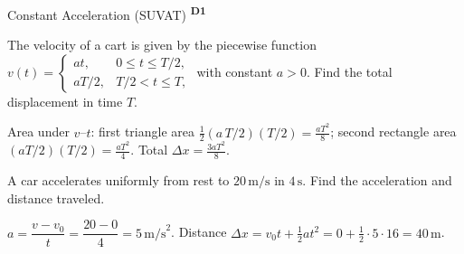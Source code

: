 ﻿\documentclass[12pt,a4paper]{article}
\providecommand{\KPProblems}{}
\newcommand{\DOne}{\texorpdfstring{\textsuperscript{\textbf{D1}}}{ D1}}
\begin{document}
\begin{KnowledgePoint}{Constant Acceleration (SUVAT) \DOne}
  \KPProblems
  \begin{cheatproblem}
  The velocity of a cart is given by the piecewise function $v(t)=\begin{cases} a t, & 0\le t\le T/2,\\ aT/2, & T/2< t\le T,\end{cases}$ with constant $a>0$. Find the total displacement in time $T$.
  \begin{solutionbox}
  Area under $v$--$t$: first triangle area $\tfrac12(a\,T/2)(T/2)=\tfrac{aT^2}{8}$; second rectangle area $(aT/2)(T/2)=\tfrac{aT^2}{4}$. Total $\Delta x=\tfrac{3aT^2}{8}$.
  \end{solutionbox}
  \end{cheatproblem}
\begin{cheatproblem}
  A car accelerates uniformly from rest to $20\,\text{m/s}$ in $4\,\text{s}$. Find the acceleration and distance traveled.
\begin{solutionbox}
  $a=\dfrac{v-v_0}{t}=\dfrac{20-0}{4}=5\,\text{m/s}^2$. Distance $\Delta x=v_0 t+\tfrac12 a t^2=0+\tfrac12\cdot5\cdot16=40\,\text{m}$.
  \end{solutionbox}
  \end{cheatproblem}
\end{KnowledgePoint}
\end{document}
